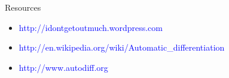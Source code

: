 \documentclass{beamer}
\begin{document}
\begin{frame}[fragile]{Resources}
\begin{itemize}
\item \textcolor{blue}{http://idontgetoutmuch.wordpress.com}
\item
  \textcolor{blue}{http://en.wikipedia.org/wiki/Automatic\_differentiation}
\item \textcolor{blue}{http://www.autodiff.org}
\end{itemize}
\end{frame}
\end{document}
